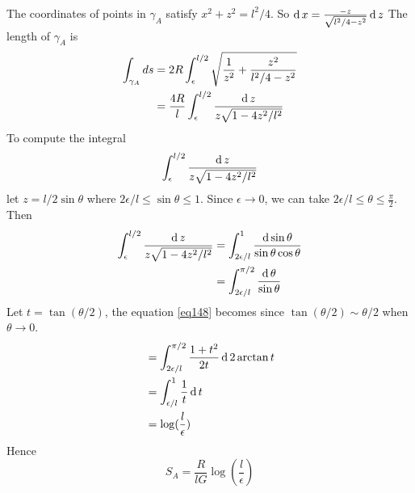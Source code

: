 \subsubsection{}
The coordinates of points in $\gamma_A$ satisfy $x^2 + z^2 = l^2/4$. So $\operatorname{d} x = \frac{-z}{\sqrt{l^2/4 - z^2}} \operatorname{d} z$
The length of $\gamma_A$ is 
\begin{equation}
	\begin{split}
	\int_{\gamma_A} ds & = 2 R\int_{\epsilon}^{l/2}  \sqrt{\frac{1}{z^2} + \frac{z^2}{l^2/4 -z^2}}\\
	& = \frac{4R}{l} \int_{\epsilon}^{l/2} \frac{\operatorname{d} z}{z \sqrt{1- 4z^2/l^2}}
	\end{split}
\end{equation}
To compute the integral
\[
\int_{\epsilon}^{l/2} \frac{\operatorname{d} z}{z \sqrt{1-4z^2/l^2}}
\]
let $z=l/2 \sin \theta$ where $2\epsilon/l \leq  \sin \theta \leq 1$. Since $\epsilon \to 0$, we can take $ 2 \epsilon/l \leq \theta \leq \frac{\pi}{2}$. Then
\begin{equation}
\label{eq148}
	\begin{split}
	\int_{\epsilon}^{l/2} \frac{\operatorname{d} z}{z \sqrt{1-4 z^2/l^2}} & = \int_{2\epsilon/l}^{1} \frac{\operatorname{d} \sin \theta}{\sin \theta \cos \theta}\\
	& = \int_{2\epsilon/l}^{\pi/2} \frac{\operatorname{d} \theta}{\sin \theta}
	\end{split}
\end{equation}
Let $t = \tan (\theta/2)$, the equation \ref{eq148} becomes since $\tan(\theta/2) \sim  \theta/2$ when $\theta \to 0$.
\begin{equation}
	\begin{split}
	&=\int_{2\epsilon/l}^{\pi/2} \frac{1+t^2}{2t} \operatorname{d} 2\arctan t\\
	&= \int_{\epsilon/l}^{1}\frac{1}{t} \operatorname{d} t\\
	& = \log (\frac{l}{\epsilon})
	\end{split}
\end{equation}
Hence 
\begin{equation}
	S_A = \frac{R}{lG} \log \left( \frac{l}{\epsilon} \right)
\end{equation}
